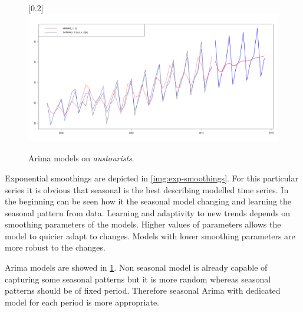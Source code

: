     \begin{figure}[H]
        \begin{center}
            \scalebox{0.25}[0.2]{\includegraphics{img/arima-sarima.pdf}}
            \caption{Arima models on \emph{austourists}.}
            \label{img:arimas}
        \end{center}
    \end{figure}

    Exponential smoothings are depicted in \ref{img:exp-smoothings}. For this particular series it is obvious that
    seasonal is the best describing modelled time series. In the beginning can be seen how it the seasonal model
    changing and learning the seasonal pattern from data. Learning and adaptivity to new trends depends on smoothing
    parameters of the models. Higher values of parameters allows the model to quicier adapt to changes. Models with
    lower smoothing parameters are more robust to the changes.

    Arima models are showed in \ref{img:arimas}. Non seasonal model is already capable of capturing some seasonal
    patterns but it is more random whereas seasonal patterns should be of fixed period. Therefore seasonal Arima with
    dedicated model for each period is more appropriate.

